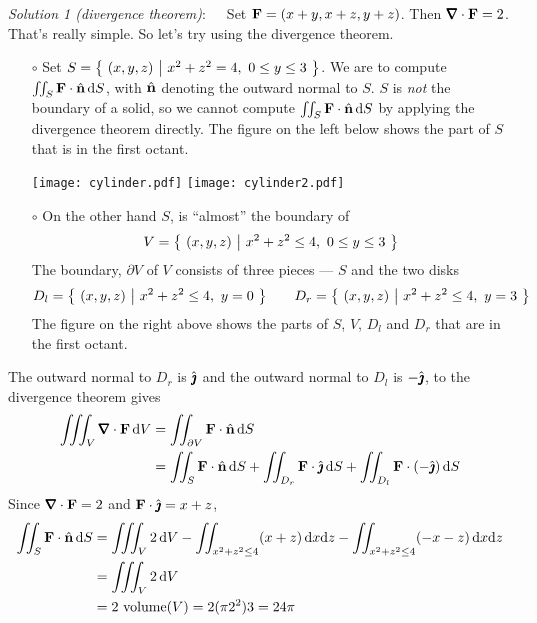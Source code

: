 \begin{solution} 
\emph{Solution 1 (divergence theorem)}:\ \ \ 
Set $\mathbf{F} = (x + y, x + z, y + z)$.
Then $\vnabla\cdot\vF = 2$. That's really simple. So let's
try using the divergence theorem.

\begin{itemize}\itemsep1pt \parskip0pt  %
\item[$\circ$]
Set $S=\big\{ \ (x,y,z)\ \big|\ x^2+z^2=4,\ 0\le y\le 3\ \big\}$. We are to compute
$\iint_S\mathbf{F}\cdot\hat{\mathbf{n}}\,\mathrm{d}S$, with $\hat{\mathbf{n}}$ denoting the outward normal to $S$.
$S$ is \emph{not} the boundary of a solid, so we cannot compute
$\iint_S\mathbf{F}\cdot\hat{\mathbf{n}}\,\mathrm{d}S$ by applying the divergence theorem directly.
The figure on the left below shows the part of $S$ that is in the first octant.

\begin{center}
       \texttt{[image: cylinder.pdf]}\qquad
       \texttt{[image: cylinder2.pdf]}
\end{center}


\item[$\circ$]
On the other hand $S$, is ``almost'' the boundary of 
\begin{equation*}
V = \big\{ \ (x,y,z)\ \big|\ x^2+z^2\le 4,\ 0\le y\le 3\ \big\}
\end{equation*} 
The boundary, $\partial V$ of $V$ consists of three pieces --- $S$ and the
two disks
\begin{equation*}
D_l = \big\{ \ (x,y,z)\ \big|\ x^2+z^2\le 4,\ y=0\ \big\}\qquad
D_r = \big\{ \ (x,y,z)\ \big|\ x^2+z^2\le 4,\ y=3\ \big\}
\end{equation*}
The figure on the right above shows the parts of $S$, $V$, $D_l$ 
and $D_r$ that are  in the first octant.
\end{itemize}
The outward normal to $D_r$ is $\hat{\pmb{\jmath}}$ and the outward normal to $D_l$ is
$-\hat{\pmb{\jmath}}$, to the divergence theorem gives
\begin{align*}
\tripInt_V \vnabla\cdot \vF\,\dee{V}
&=\dblInt_{\partial V}\vF\cdot\hn\,\dee{S} \\
&=\dblInt_{S}\vF\cdot\hn\,\dee{S}
  + \dblInt_{D_r}\vF\cdot\hj\,\dee{S}
  + \dblInt_{D_l}\vF\cdot(-\hj)\,\dee{S}
\end{align*}
Since $\vnabla\cdot\vF = 2$ and $\mathbf{F}\cdot\hat{\pmb{\jmath}} = x+z$, 
\begin{align*}
\iint_{S}\mathbf{F}\cdot\hat{\mathbf{n}}\,\mathrm{d}S
&= \iiint_V 2\,\mathrm{d}V
  -\iint_{x^2+z^2\le 4}(x+z)\,\mathrm{d}x\mathrm{d}z
  - \iint_{x^2+z^2\le 4}(-x-z)\,\mathrm{d}x\mathrm{d}z \\
&= \iiint_V 2\,\mathrm{d}V \\
&= 2\ \text{volume}(V)
=2(\pi 2^2) 3 =24\pi
\end{align*}


\end{solution}

